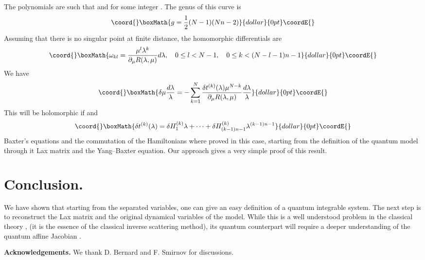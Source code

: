 \documentclass[a4paper,11pt]{article}
\begin{document}
The polynomials \coordHE{} are such that 
\coordHE{} and 
\coordHE{} 
for some integer \coordHE{}. The genus of this curve is
$$\coord{}\boxMath{
g = {1\over 2} (N-1)(Nn-2)
}{dollar}{0pt}\coordE{}$$
Assuming that there is no singular point at finite distance, the homomorphic differentials are
$$\coord{}\boxMath{
\omega_{kl} = { \mu^l \lambda^k \over \partial_\mu R(\lambda,\mu) } d\lambda,\quad
0 \leq l < N-1,\quad 0 \leq k < (N-l-1)n -1
}{dollar}{0pt}\coordE{}$$
We have
$$\coord{}\boxMath{
\delta \mu {d\lambda \over \lambda} = - \sum_{k=1}^N {\delta t^{(k)}(\lambda) \mu^{N-k} 
\over \partial_\mu R(\lambda, \mu) } {d\lambda \over \lambda}
}{dollar}{0pt}\coordE{}$$
This will be holomorphic if \coordHE{} and
$$\coord{}\boxMath{
\delta t^{(k)}(\lambda) =\delta H^{(k)}_1 \lambda  + \cdots  + \delta H^{(k)}_{(k-1)n -1}\lambda^{(k-1)n -1}
}{dollar}{0pt}\coordE{}$$
Baxter's equations and the commutation of the Hamiltonians
where proved in this case, starting from the definition of the quantum model
through it Lax matrix and the Yang--Baxter equation. Our approach gives a very simple 
proof of this result.


\section{Conclusion.}

We have shown that starting from the separated 
variables, one can give an easy definition of a quantum integrable system.
The next step is to reconstruct the Lax matrix and the original dynamical
variables of the model. While this is a well understood problem in the classical theory 
\cite{DuKrNo90, BaBeTa03},
(it is the essence of the classical inverse scattering method), its quantum 
counterpart will require a deeper understanding of the quantum affine Jacobian \cite{Smi00}.

{\bf Acknowledgements.} We thank D. Bernard and F. Smirnov for discussions.
\end{document}
